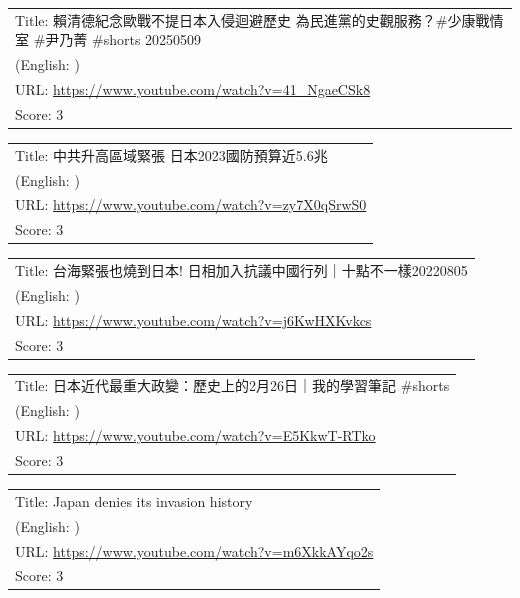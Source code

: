 \documentclass{article}
\begin{document}
\noindent
\begin{tabular}{p{}}
Title: 賴清德紀念歐戰不提日本入侵迴避歷史 為民進黨的史觀服務？\#少康戰情室 \#尹乃菁 \#shorts 20250509 \\
(English: ) \\
URL: \url{https://www.youtube.com/watch?v=41_NgaeCSk8} \\
Score: 3 \\
\end{tabular}
\vspace{0.5em}

\noindent
\begin{tabular}{p{}}
Title: 中共升高區域緊張 日本2023國防預算近5.6兆 \\
(English: ) \\
URL: \url{https://www.youtube.com/watch?v=zy7X0qSrwS0} \\
Score: 3 \\
\end{tabular}
\vspace{0.5em}

\noindent
\begin{tabular}{p{}}
Title: 台海緊張也燒到日本! 日相加入抗議中國行列｜十點不一樣20220805 \\
(English: ) \\
URL: \url{https://www.youtube.com/watch?v=j6KwHXKvkcs} \\
Score: 3 \\
\end{tabular}
\vspace{0.5em}

\noindent
\begin{tabular}{p{}}
Title: 日本近代最重大政變：歷史上的2月26日｜我的學習筆記 \#shorts \\
(English: ) \\
URL: \url{https://www.youtube.com/watch?v=E5KkwT-RTko} \\
Score: 3 \\
\end{tabular}
\vspace{0.5em}

\noindent
\begin{tabular}{p{}}
Title: Japan denies its invasion history \\
(English: ) \\
URL: \url{https://www.youtube.com/watch?v=m6XkkAYqo2s} \\
Score: 3 \\
\end{tabular}
\vspace{0.5em}
\end{document}
